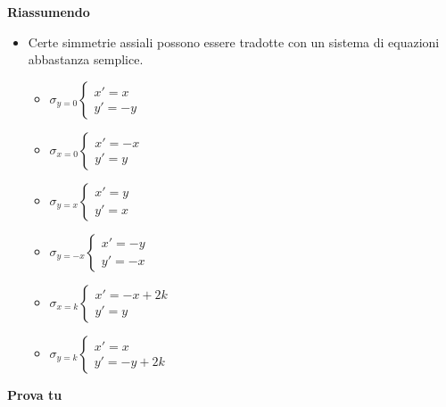 \textbf{Riassumendo}
\begin{itemize} [noitemsep]
\item Certe simmetrie assiali possono essere tradotte con un sistema di 
equazioni
abbastanza semplice.
\begin{multicols}{2}
\begin{itemize} [noitemsep]
\item \(\sigma_{y = 0} \left \{
\begin{array}{l} x' = x \\ y' = -y \end{array} \right .\)
\item \(\sigma_{x = 0} \left \{
\begin{array}{l} x' = -x \\ y' = y \end{array} \right .\)
\item \(\sigma_{y = x} \left \{
\begin{array}{l} x' = y \\ y' = x \end{array} \right .\)
\item \(\sigma_{y = -x} \left \{
\begin{array}{l} x' = -y \\ y' = -x \end{array} \right .\)
\item \(\sigma_{x = k} \left \{
\begin{array}{l} x' = -x + 2k \\ y' = y \end{array} \right .\)
\item \(\sigma_{y = k} \left \{
\begin{array}{l} x' = x \\ y' = -y + 2k \end{array} \right .\)
\end{itemize}
\end{multicols}
\end{itemize}

\newpage %

\textbf{Prova tu}

